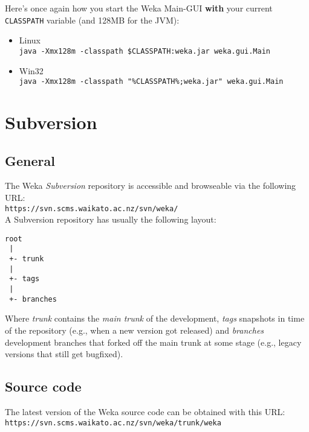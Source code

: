 \noindent Here's once again how you start the Weka Main-GUI \textbf{with} your current \verb=CLASSPATH= variable (and 128MB for the JVM):

\begin{itemize}
\item Linux\\ \verb=java -Xmx128m -classpath $CLASSPATH:weka.jar weka.gui.Main=
\item Win32\\ \verb=java -Xmx128m -classpath "%CLASSPATH%;weka.jar" weka.gui.Main=
\end{itemize}


\section{Subversion}

\subsection{General}
The Weka \textit{Subversion} repository is accessible and browseable via the following URL:\\

\verb=https://svn.scms.waikato.ac.nz/svn/weka/=\\

\noindent A Subversion repository has usually the following layout:

\begin{verbatim}
root
 |
 +- trunk
 |
 +- tags
 |
 +- branches
\end{verbatim}

\noindent Where \textit{trunk} contains the \textit{main trunk} of the
development, \textit{tags} snapshots in time of the repository (e.g.,
when a new version got released) and \textit{branches} development branches
that forked off the main trunk at some stage (e.g., legacy versions
that still get bugfixed).

\subsection{Source code}
The latest version of the Weka source code can be obtained with this URL:\\

\verb=https://svn.scms.waikato.ac.nz/svn/weka/trunk/weka=\\

